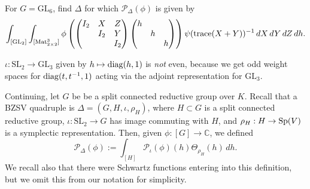 \documentclass[reqno]{amsart} 
\numberwithin{theorem}{section}
\numberwithin{equation}{section}
\numberwithin{exercise}{section}
\begin{document}
\begin{exercise}\label{exercise:cq6tho3oca}
  For $G = \mathrm{GL}_6$, find $\Delta$ for which $\mathcal{P}_\Delta(\phi)$ is given by
  \begin{equation*}
    \int_{[\mathrm{GL}_2]} \int_{[\operatorname{Mat}_{2 \times 2}^3]} \phi
    \left(
      \begin{pmatrix}
        I_2      & X & Z \\
                 & I_2 & Y \\
                 &  & I_2 \\
      \end{pmatrix}
      \begin{pmatrix}
        h      &  &  \\
               & h &  \\
               &  & h \\
      \end{pmatrix}\right)
    \psi(\operatorname{trace}(X + Y))^{-1}
    \, d X \, d Y \, d Z \, d h.
  \end{equation*}
\end{exercise}

\begin{example}\label{example:cq6tho3m7k}
  $\iota : \mathrm{SL}_2 \rightarrow \mathrm{GL}_3$ given by $h \mapsto \operatorname{diag}(h, 1)$ is \emph{not} even, because we get odd weight spaces for $\operatorname{diag}(t, t^{-1}, 1)$ acting via the adjoint representation for $\mathrm{GL}_3$.
\end{example}

Continuing, let $G$ be be a split connected reductive group over $K$.  Recall that a BZSV quadruple is $\Delta =(G, H, \iota, \rho_H)$, where $H \subset G$ is a split connected reductive group, $\iota : \mathrm{SL}_2 \rightarrow G$ has image commuting with $H$, and $\rho_H : H \rightarrow \operatorname{Sp}(V)$ is a symplectic representation.  Then, given $\phi :[G] \rightarrow \mathbb{C}$, we defined
\begin{equation*}
  \mathcal{P}_\Delta(\phi) := \int_{[H]} \mathcal{P}_\iota(\phi)(h) \Theta_{\rho_H}(h) \, d h.
\end{equation*}
We recall also that there were Schwartz functions entering into this definition, but we omit this from our notation for simplicity.
\end{document}
